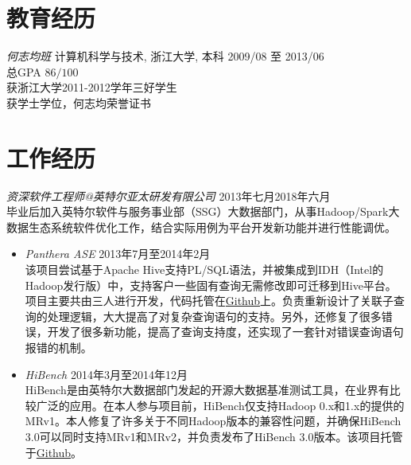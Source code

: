 \documentclass[line,margin]{res}
\begin{document}
\address{联系电话:\sl +86-152-1686-1267}
\address{E-mail:\sl me at daoyuan.wang}


\begin{resume}

\section{教育经历} {\sl 何志均班} 计算机科学与技术, 浙江大学, 本科 \hfill 2009/08 至 2013/06\\
                总GPA $86/100$\\
                获浙江大学2011-2012学年三好学生\\
                获学士学位，何志均荣誉证书\\

\section{工作经历} 
    {\sl 资深软件工程师@英特尔亚太研发有限公司} \hfill         2013年七月2018年六月\\
    毕业后加入英特尔软件与服务事业部（SSG）大数据部门，从事Hadoop/Spark大数据生态系统软件优化工作，结合实际用例为平台开发新功能并进行性能调优。\\
        \begin{itemize}
            \item{\sl Panthera ASE} \hfill        2013年7月至2014年2月\\
                该项目尝试基于Apache Hive支持PL/SQL语法，并被集成到IDH（Intel的Hadoop发行版）中，支持客户一些固有查询无需修改即可迁移到Hive平台。项目主要共由三人进行开发，代码托管在\href{https://github.com/intel-hadoop/project-panthera}{Github}上。负责重新设计了关联子查询的处理逻辑，大大提高了对复杂查询语句的支持。另外，还修复了很多错误，开发了很多新功能，提高了查询支持度，还实现了一套针对错误查询语句报错的机制。\\

             \item{\sl HiBench} \hfill        2014年3月至2014年12月\\
                HiBench是由英特尔大数据部门发起的开源大数据基准测试工具，在业界有比较广泛的应用。在本人参与项目前，HiBench仅支持Hadoop 0.x和1.x的提供的MRv1。本人修复了许多关于不同Hadoop版本的兼容性问题，并确保HiBench 3.0可以同时支持MRv1和MRv2，并负责发布了HiBench 3.0版本。该项目托管于\href{https://github.com/intel-hadoop/HiBench}{Github}。\\
                   

\end{itemize}
\end{resume}
\end{document}
